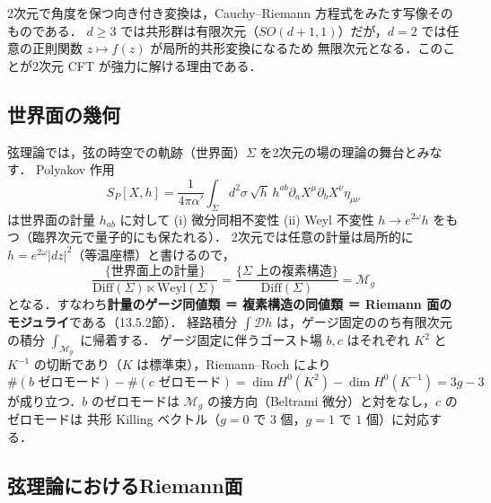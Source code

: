 \begin{physbox}
2次元で角度を保つ向き付き変換は，Cauchy--Riemann 方程式をみたす写像そのものである．
$d\geq3$ では共形群は有限次元（$SO(d+1,1)$）だが，$d=2$ では任意の正則関数 $z\mapsto f(z)$ が局所的共形変換になるため
無限次元となる．このことが2次元 CFT が強力に解ける理由である．
\end{physbox}

\subsection{世界面の幾何}

弦理論では，弦の時空での軌跡（世界面）$\Sigma$ を2次元の場の理論の舞台とみなす．
Polyakov 作用
\begin{equation}
  S_P[X,h] = \frac{1}{4\pi\alpha'}\int_\Sigma d^2\sigma\,\sqrt{h}\,h^{ab}\partial_aX^\mu\partial_bX^\nu\eta_{\mu\nu}
\end{equation}
は世界面の計量 $h_{ab}$ に対して (i) 微分同相不変性 (ii) Weyl 不変性 $h\to e^{2\omega}h$ をもつ（臨界次元で量子的にも保たれる）．
2次元では任意の計量は局所的に $h = e^{2\omega}|dz|^2$（等温座標）と書けるので，
\begin{equation}
  \frac{\{\text{世界面上の計量}\}}{\mathrm{Diff}(\Sigma)\ltimes\mathrm{Weyl}(\Sigma)} = \frac{\{\text{$\Sigma$ 上の複素構造}\}}{\mathrm{Diff}(\Sigma)} = \mathcal{M}_g
\end{equation}
となる．すなわち\textbf{計量のゲージ同値類 ＝ 複素構造の同値類 ＝ Riemann 面のモジュライ}である（13.5.2節）．
経路積分 $\int\mathcal{D}h$ は，ゲージ固定ののち有限次元の積分 $\int_{\mathcal{M}_g}$ に帰着する．
ゲージ固定に伴うゴースト場 $b,c$ はそれぞれ $K^2$ と $K^{-1}$ の切断であり（$K$ は標準束），Riemann--Roch により
\begin{equation}
  \#(b\text{ ゼロモード}) - \#(c\text{ ゼロモード}) = \dim H^0(K^2)-\dim H^0(K^{-1}) = 3g-3
\end{equation}
が成り立つ．$b$ のゼロモードは $\mathcal{M}_g$ の接方向（Beltrami 微分）と対をなし，$c$ のゼロモードは
共形 Killing ベクトル（$g=0$ で $3$ 個，$g=1$ で $1$ 個）に対応する．

\subsection{弦理論におけるRiemann面}

